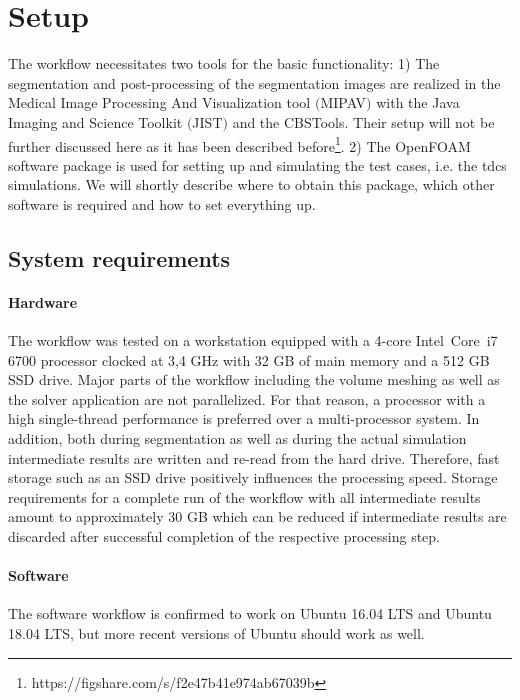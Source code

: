 \section{Setup}
The workflow necessitates two tools for the basic functionality: 1) The segmentation and post-processing of the segmentation images
are realized in the Medical Image Processing And Visualization tool $($MIPAV$)$ \cite{mcauliffe2001medical} with the Java Imaging
and Science Toolkit $($JIST$)$ \cite{lucas2010java} and the CBSTools. Their setup will not be further discussed here as it has
been described before\footnote{https://figshare.com/s/f2e47b41e974ab67039b}\cite{kalloch2018semi}. 2) The OpenFOAM software
package is used for setting up and simulating the test cases, i.e. the tdcs simulations. We will shortly describe where to obtain
this package, which other software is required and how to set everything up.

\subsection{System requirements}
\paragraph{Hardware}
The workflow was tested on a workstation equipped with a 4-core Intel\textsuperscript{\textregistered}~Core\texttrademark~i7 6700
processor clocked at 3,4 GHz with 32 GB of main memory and a 512 GB SSD drive. Major parts of the workflow including the volume
meshing as well as the solver application are not parallelized. For that reason, a processor with a high single-thread performance
is preferred over a multi-processor system. In addition, both during segmentation as well as during the actual simulation intermediate
results are written and re-read from the hard drive. Therefore, fast storage such as an SSD drive positively influences the
processing speed. Storage requirements for a complete run of the workflow with all intermediate results amount to approximately
30 GB which can be reduced if intermediate results are discarded after successful completion of the respective processing step.

\paragraph{Software}
The software workflow is confirmed to work on Ubuntu 16.04 LTS and Ubuntu 18.04 LTS, but more recent versions of Ubuntu should
work as well.

